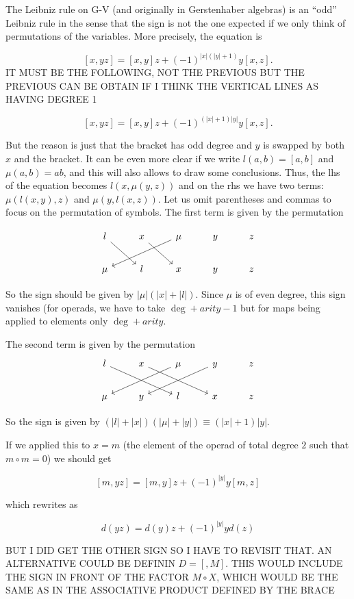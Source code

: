 \documentclass[twoside]{article}
\begin{document}
\begin{remark}
The Leibniz rule on G-V (and originally in Gerstenhaber algebras) is an ``odd'' Leibniz rule in the sense that the sign is not the one expected if we only think of permutations of the variables. More precisely, the equation is

$$[x,yz]=[x,y]z+(-1)^{|x|(|y|+1)}y[x,z].$$
IT MUST BE THE FOLLOWING, NOT THE PREVIOUS BUT THE PREVIOUS CAN BE OBTAIN IF I THINK THE VERTICAL LINES AS HAVING DEGREE 1

$$[x,yz]=[x,y]z+(-1)^{(|x|+1)|y|}y[x,z].$$

But the reason is just that the bracket has odd degree and $y$ is swapped by both $x$ and the bracket. It can be even more clear if we write $l(a,b)=[a,b]$ and $\mu(a,b)=ab$, and this will also allows to draw some conclusions. Thus, the lhs of the equation becomes $l(x,\mu(y,z))$ and on the rhs we have two terms: $\mu(l(x,y),z)$ and $\mu(y,l(x,z))$. Let us omit parentheses and commas to focus on the permutation of symbols. The first term is given by the permutation

\[
\begin{tikzcd}
l\arrow[dr] & x\arrow[dr] & \mu\arrow[dll] & y & z\\
\mu & l & x & y & z
\end{tikzcd}
\]

So the sign should be given by $|\mu|(|x|+|l|)$. Since $\mu$ is of even degree, this sign vanishes (for operads, we have to take $\deg+arity-1$ but for maps being applied to elements only $\deg+arity$.

The second term is given by the permutation
\[
\begin{tikzcd}
l \arrow[drr]& x\arrow[drr] & \mu\arrow[dll] & y\arrow[dll] & z\\
\mu & y & l & x & z
\end{tikzcd}
\]

So the sign is given by $(|l|+|x|)(|\mu|+|y|)\equiv (|x|+1)|y|$. 

If we applied this to $x=m$ (the element of the operad of total degree $2$ such that $m\circ m=0$) we should get

$$[m,yz]=[m,y]z+(-1)^{|y|}y[m,z]$$

which rewrites as

$$d(yz)=d(y)z+(-1)^{|y|}yd(z)$$

BUT I DID GET THE OTHER SIGN SO I HAVE TO REVISIT THAT. AN ALTERNATIVE COULD BE DEFININ $D=[,M]$. THIS WOULD INCLUDE THE SIGN IN FRONT OF THE FACTOR $M \circ X$, WHICH WOULD BE THE SAME AS IN THE ASSOCIATIVE PRODUCT DEFINED BY THE BRACE




\end{remark}
\end{document}
